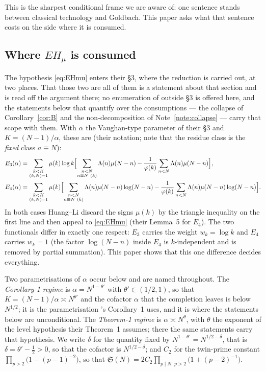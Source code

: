 \documentclass[11pt,a4paper]{article}
\theoremstyle{plain}
\theoremstyle{definition}
\theoremstyle{remark}
\renewcommand{\SS}{\mathfrak{S}}
\begin{document}
This is the sharpest conditional frame we are aware of: one sentence
stands between classical technology and Goldbach. This paper asks what
that sentence costs on the side where it is consumed.

\subsection{Where \texorpdfstring{$EH_\mu$}{EH-mu} is consumed}

The hypothesis \eqref{eq:EHmu} enters their \S3, where the reduction
is carried out, at two places. That those two are all of them is a
statement about that section and is read off the argument there; no
enumeration of \cite{HL} outside \S3 is offered here, and the
statements below that quantify over the consumptions --- the collapse
of Corollary~\ref{cor:B} and the non-decomposition of
Note~\ref{note:collapse} --- carry that scope with them.
With $\alpha$ the Vaughan-type parameter of their \S3 and
$K=(N-1)/\alpha$, these are (their notation; note that the residue
class is the \emph{fixed} class $a\equiv N$):
\begin{align}
  E_3(\alpha) &= \sum_{\substack{k<K\\ (k,N)=1}}\mu(k)\log k
    \Bigl[\sum_{\substack{n<N\\ n\equiv N\ (k)}}\Lambda(n)\mu(N-n)
      -\frac{1}{\varphi(k)}\sum_{n<N}\Lambda(n)\mu(N-n)\Bigr],
      \label{eq:E3}\\
  E_4(\alpha) &= \sum_{\substack{k<K\\ (k,N)=1}}\mu(k)
    \Bigl[\sum_{\substack{n<N\\ n\equiv N\ (k)}}\Lambda(n)\mu(N-n)\log(N-n)
      -\frac{1}{\varphi(k)}\sum_{n<N}\Lambda(n)\mu(N-n)\log(N-n)\Bigr].
      \label{eq:E4}
\end{align}
In both cases Huang--Li discard the signs $\mu(k)$ by the triangle
inequality on the first line and then appeal to \eqref{eq:EHmu} (their
Lemma~5 for $E_4$). The two functionals differ in exactly one respect:
$E_3$ carries the weight $w_k=\log k$ and $E_4$ carries $w_k=1$ (the
factor $\log(N-n)$ inside $E_4$ is $k$-independent and is removed by
partial summation). This paper shows that this one difference decides
everything.

Two parametrisations of $\alpha$ occur below and are named throughout.
The \emph{Corollary-1 regime} is $\alpha=N^{1-\theta'}$ with
$\theta'\in(1/2,1)$, so that $K=(N-1)/\alpha\asymp N^{\theta'}$ and the
cofactor $\alpha$ that the completion leaves is below $N^{1/2}$; it is
the parametrisation \cite{HL}'s Corollary~1 uses, and it is where the
statements below are unconditional. The \emph{Theorem-1 regime} is
$\alpha\asymp N^{\theta}$, with $\theta$ the exponent of the level
hypothesis their Theorem~1 assumes; there the same statements carry
that hypothesis. We write $\delta$ for the quantity fixed by
$N^{1-\theta'}=N^{1/2-\delta}$, that is $\delta=\theta'-\tfrac12>0$,
so that the cofactor is $N^{1/2-\delta}$; and $C_2$ for the twin-prime
constant $\prod_{p>2}\bigl(1-(p-1)^{-2}\bigr)$, so that
$\SS(N)=2C_2\prod_{p\mid N,\,p>2}\bigl(1+(p-2)^{-1}\bigr)$.
\end{document}
